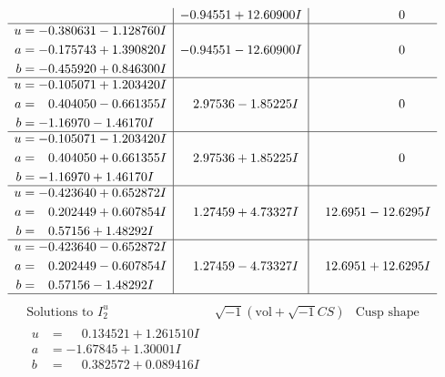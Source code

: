 \documentclass[1p]{elsarticle_modified}
\theoremstyle{definition}
\newcommand{\I}{\sqrt{-1}}
\begin{document}
$$\begin{array}{c|c|c}
 & -0.94551 + 12.60900 I & \phantom{-0.000000 } 0 \\ \hline\begin{aligned}
u &= -0.380631 - 1.128760 I \\
a &= -0.175743 + 1.390820 I \\
b &= -0.455920 + 0.846300 I\end{aligned}
 & -0.94551 - 12.60900 I & \phantom{-0.000000 } 0 \\ \hline\begin{aligned}
u &= -0.105071 + 1.203420 I \\
a &= \phantom{-}0.404050 - 0.661355 I \\
b &= -1.16970 - 1.46170 I\end{aligned}
 & \phantom{-}2.97536 - 1.85225 I & \phantom{-0.000000 } 0 \\ \hline\begin{aligned}
u &= -0.105071 - 1.203420 I \\
a &= \phantom{-}0.404050 + 0.661355 I \\
b &= -1.16970 + 1.46170 I\end{aligned}
 & \phantom{-}2.97536 + 1.85225 I & \phantom{-0.000000 } 0 \\ \hline\begin{aligned}
u &= -0.423640 + 0.652872 I \\
a &= \phantom{-}0.202449 + 0.607854 I \\
b &= \phantom{-}0.57156 + 1.48292 I\end{aligned}
 & \phantom{-}1.27459 + 4.73327 I & \phantom{-}12.6951 - 12.6295 I \\ \hline\begin{aligned}
u &= -0.423640 - 0.652872 I \\
a &= \phantom{-}0.202449 - 0.607854 I \\
b &= \phantom{-}0.57156 - 1.48292 I\end{aligned}
 & \phantom{-}1.27459 - 4.73327 I & \phantom{-}12.6951 + 12.6295 I\\
 \hline 
 \end{array}$$\newpage$$\begin{array}{c|c|c}  
\text{Solutions to }I^u_{2}& \I (\text{vol} + \sqrt{-1}CS) & \text{Cusp shape}\\
 \hline 
\begin{aligned}
u &= \phantom{-}0.134521 + 1.261510 I \\
a &= -1.67845 + 1.30001 I \\
b &= \phantom{-}0.382572 + 0.089416 I\end{aligned}

\end{array}$$
\end{document}
